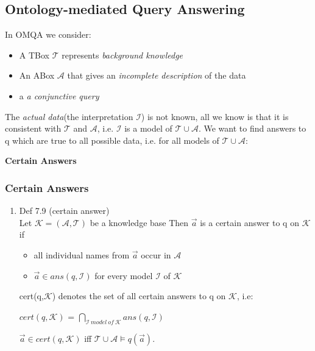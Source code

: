 \documentclass[11pt]{article}
\begin{document}
\subsection{Ontology-mediated Query Answering}
\label{sec-1-2}
In OMQA we consider:
\begin{itemize}
\item A TBox $\mathcal{T}$ represents \textit{background knowledge}
\item An ABox $\mathcal{A}$ that gives an \textit{incomplete description}
of the data
\item a \textit{a conjunctive query}
\end{itemize}

The \textit{actual data}(the interpretation $\mathcal{I}$) is not 
known, all we know is that it is consistent with $\mathcal{T}$ and 
$\mathcal{A}$, i.e. $\mathcal{I}$ is a model of $\mathcal{T} \cup  
   \mathcal{A}$.
We want to find answers to q which are true to all possible data,
i.e. for all models of $\mathcal{T} \cup \mathcal{A}$:
\begin{center}
\textbf{Certain Answers}
\end{center}

\subsubsection{Certain Answers}
\label{sec-1-2-1}
\begin{enumerate}
\item Def 7.9 (certain answer) \\
\label{sec-1-2-1-1}
Let $\mathcal{K} = (\mathcal{A}, \mathcal{T})$ be a knowledge base
Then $\overset{\to}{a}$ is a certain answer to q on $\mathcal{K}$ if
\begin{itemize}
\item all individual names from $\overset{\to}{a}$ occur in 
$\mathcal{A}$
\item $\overset{\to}{a} \in ans(q, \mathcal{I})$ for every model
$\mathcal{I}$ of $\mathcal{K}$
\end{itemize}
cert(q,$\mathcal{K}$) denotes the set of all certain answers to q
on $\mathcal{K}$, i.e: \\
\begin{center}
$cert(q,\mathcal{K})$ = $\bigcap_{\mathcal{I} \ model \ of \ \mathcal{K}} ans(q, \mathcal{I})$
\end{center}

$\overset{\to}{a} \in cert(q,\mathcal{K})$ iff 
$\mathcal{T} \cup \mathcal{A} \models q(\overset{\to}{a})$.
\end{enumerate}
\end{document}
